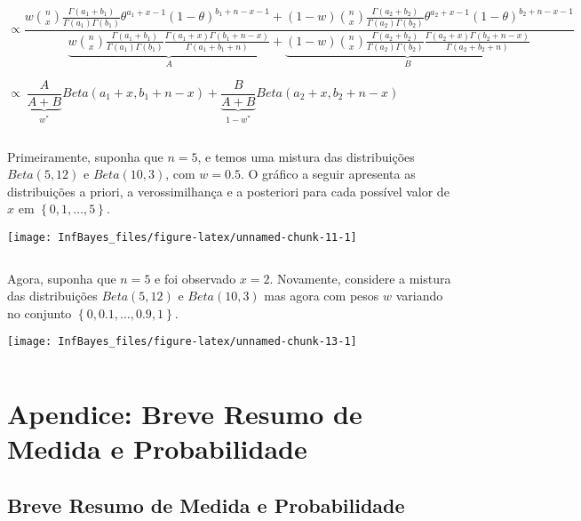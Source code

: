 \documentclass[
]{book}
\begin{document}
\(\propto\dfrac{w\binom{n}{x}\frac{\Gamma(a_1+b_1)}{\Gamma(a_1)\Gamma(b_1)}\theta^{a_1+x-1}(1-\theta)^{b_1+n-x-1}+(1-w)\binom{n}{x}\frac{\Gamma(a_2+b_2)}{\Gamma(a_2)\Gamma(b_2)}\theta^{a_2+x-1}(1-\theta)^{b_2+n-x-1}}{\underbrace{w\binom{n}{x}\frac{\Gamma(a_1+b_1)}{\Gamma(a_1)\Gamma(b_1)}\frac{\Gamma(a_1+x)\Gamma(b_1+n-x)}{\Gamma(a_1+b_1+n)}}_{A}+\underbrace{(1-w)\binom{n}{x}\frac{\Gamma(a_2+b_2)}{\Gamma(a_2)\Gamma(b_2)}\frac{\Gamma(a_2+x)\Gamma(b_2+n-x)}{\Gamma(a_2+b_2+n)}}_{B}}\)

\(\propto~\underbrace{\dfrac{A}{A+B}}_{w^*}Beta(a_1+x,b_1+n-x)+\underbrace{\dfrac{B}{A+B}}_{1-w^*}Beta(a_2+x,b_2+n-x)\)

\(~\)

Primeiramente, suponha que \(n=5\), e temos uma mistura das distribuições \(Beta(5,12)\) e \(Beta(10,3)\), com \(w=0.5\). O gráfico a seguir apresenta as distribuições a priori, a verossimilhança e a posteriori para cada possível valor de \(x\) em \(\left\{0,1,\ldots,5\right\}\).

\begin{center}\texttt{[image: InfBayes\_files/figure-latex/unnamed-chunk-11-1]} \end{center}

\(~\)

Agora, suponha que \(n=5\) e foi observado \(x=2\). Novamente, considere a mistura das distribuições \(Beta(5,12)\) e \(Beta(10,3)\) mas agora com pesos \(w\) variando no conjunto \(\left\{0,0.1,\ldots,0.9,1\right\}\).

\begin{center}\texttt{[image: InfBayes\_files/figure-latex/unnamed-chunk-13-1]} \end{center}

\(~\)

\hypertarget{ape}{%
\chapter{Apendice: Breve Resumo de Medida e Probabilidade}\label{ape}}

\hypertarget{breve-resumo-de-medida-e-probabilidade}{%
\section{Breve Resumo de Medida e Probabilidade}\label{breve-resumo-de-medida-e-probabilidade}}
\end{document}
